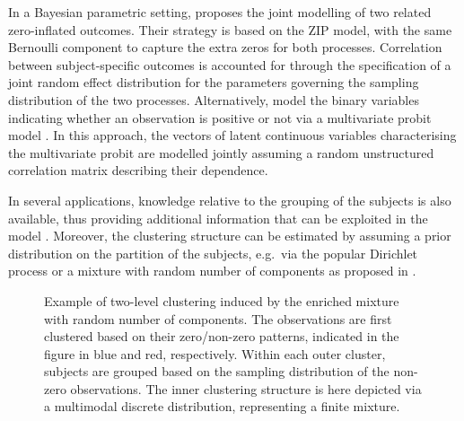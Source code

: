 \documentclass[11pt]{article}
\begin{document}
In a Bayesian parametric setting, \citet{fox2013multivariate} proposes the joint modelling of two related zero-inflated outcomes. Their strategy is based on the ZIP model,  
with the same Bernoulli component to capture the extra zeros for both processes. Correlation between subject-specific outcomes is accounted for through the specification of a joint random effect distribution for the parameters governing the sampling  distribution of the two processes.   Alternatively, \citet{lee2020bayesian} model the binary variables indicating whether an observation is positive or not via a multivariate probit model \citep{chib1998analysis,garcia2007conditional}. In this approach, the vectors of latent continuous variables characterising the multivariate probit are modelled jointly assuming a random unstructured correlation matrix describing their dependence. 

In several applications, knowledge relative to the grouping of the subjects is also available, thus providing additional information that can be exploited in the model \citep{choo2018bayesian}. Moreover, the clustering structure can be estimated by assuming a prior distribution on the partition of the subjects, e.g.\ via the popular Dirichlet process \citep{li2017bayesian} or a mixture with random number of components as proposed in \citet{hu2020zero}. 

\begin{figure}
	\centering
	
	\caption{Example of two-level clustering induced by the enriched mixture with random number of components. The observations are first clustered based on their zero/non-zero patterns, indicated in the figure in blue and red, respectively. Within each outer cluster, subjects are grouped based on the sampling distribution of the non-zero observations. The inner clustering structure is here depicted via a multimodal discrete distribution, representing a finite mixture.}
	\label{fig:Enriched_Fig}
\end{figure}
\end{document}
